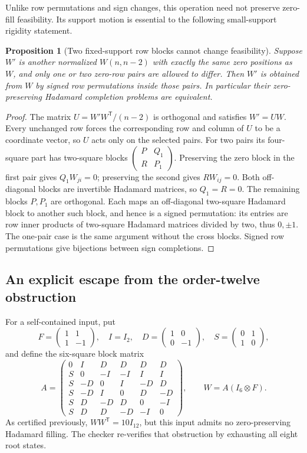 \documentclass[11pt]{article}
\newtheorem{proposition}[theorem]{Proposition}
\begin{document}
Unlike row permutations and sign changes, this operation need not
preserve zero-fill feasibility. Its support motion is essential to
the following small-support rigidity statement.

\begin{proposition}[Two fixed-support row blocks cannot change feasibility]
Suppose $W'$ is another normalized $W(n,n-2)$ with exactly the same
zero positions as $W$, and only one or two zero-row pairs are allowed
to differ. Then $W'$ is obtained from $W$ by signed row permutations
inside those pairs. In particular their zero-preserving Hadamard
completion problems are equivalent.
\end{proposition}
\begin{proof}
The matrix $U=W'W^{\mathsf T}/(n-2)$ is orthogonal and satisfies
$W'=UW$. Every unchanged row forces the corresponding row and
column of $U$ to be a coordinate vector, so $U$ acts only on the
selected pairs. For two pairs its four-square part has two-square
blocks $\left(\begin{smallmatrix}P&Q_1\\R&P_1\end{smallmatrix}\right)$.
Preserving the zero block in the first pair gives
$Q_1W_{ji}=0$; preserving the second gives $RW_{ij}=0$.
Both off-diagonal blocks are invertible Hadamard matrices, so
$Q_1=R=0$. The remaining blocks $P,P_1$ are orthogonal. Each maps
an off-diagonal two-square Hadamard block to another such block,
and hence is a signed permutation: its entries are row inner products
of two-square Hadamard matrices divided by two, thus $0,\pm1$.
The one-pair case is the same argument without the cross blocks.
Signed row permutations give bijections between sign completions.
\end{proof}

\subsection{An explicit escape from the order-twelve obstruction}
For a self-contained input, put
\[
 F=\begin{pmatrix}1&1\\1&-1\end{pmatrix},\quad
 I=I_2,\quad D=\begin{pmatrix}1&0\\0&-1\end{pmatrix},\quad
 S=\begin{pmatrix}0&1\\1&0\end{pmatrix},
\]
and define the six-square block matrix
\[
 A=\begin{pmatrix}
0&I&D&D&D&D\\S&0&-I&-I&I&I\\S&-D&0&I&-D&D\\
S&-D&I&0&D&-D\\S&D&-D&D&0&-I\\S&D&D&-D&-I&0
\end{pmatrix},\qquad W=A(I_6\otimes F).
\]
As certified previously, $WW^{\mathsf T}=10I_{12}$, but this input
admits no zero-preserving Hadamard filling. The checker re-verifies
that obstruction by exhausting all eight root states.
\end{document}
